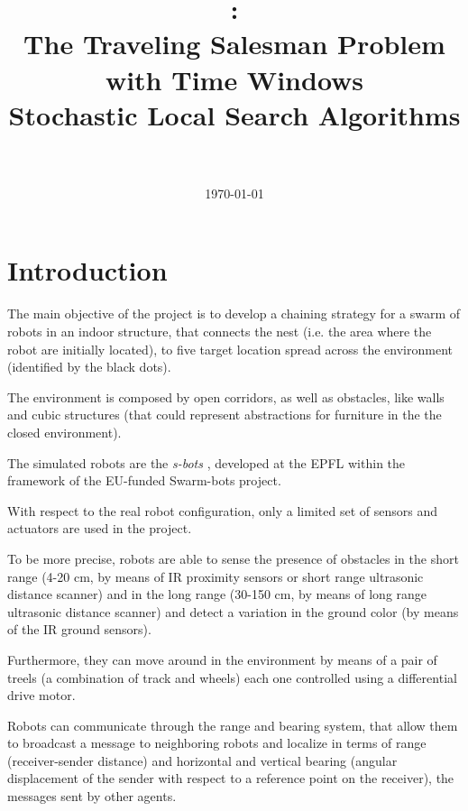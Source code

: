 \documentclass{article}
\title{
\vspace{2in}
\textmd{\textbf{\hmwkClass:\\ The Traveling Salesman Problem with Time Windows \\ Stochastic Local Search Algorithms}}\\
\vspace{0.1in}\large{\textit{\hmwkClassInstructor\ }}
\vspace{3in}
}
\author{\textbf{\hmwkAuthorName}}
\date{\today} %
\begin{document}




\newpage
\tableofcontents
\newpage

\section{Introduction}\label{introduction}

The main objective of the project is to develop a chaining strategy for a swarm of robots in an indoor structure, that connects the nest (i.e. the area where the robot are initially located), to five target location spread across the environment (identified by the black dots).

The environment is composed by open corridors, as well as obstacles, like walls and cubic structures (that could represent abstractions for furniture in the the closed environment).

The simulated robots are the \emph{s-bots} \cite{mondada2003swarm}, developed at the EPFL within the framework of the EU-funded Swarm-bots project.

With respect to the real robot configuration, only a limited set of sensors and actuators are used in the project.

To be more precise, robots are able to sense the presence of obstacles in the short range (4-20 cm, by means of IR proximity sensors or short range ultrasonic distance scanner) and in the long range (30-150 cm, by means of long range ultrasonic distance scanner) and detect a variation in the ground color (by means of the IR ground sensors).

Furthermore, they can move around in the environment by means of a pair of treels (a combination of track and wheels) each one controlled using a differential drive motor.

Robots can communicate through the range and bearing system, that allow them to broadcast a message to neighboring robots and localize in terms of range (receiver-sender distance) and horizontal and vertical bearing (angular displacement of the sender with respect to a reference point on the receiver), the messages sent by other agents.
\end{document}
